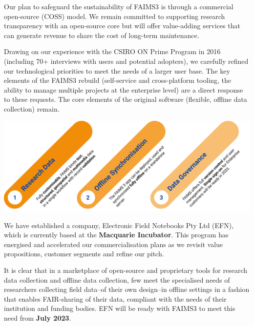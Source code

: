 \documentclass[a0,portrait]{a0poster}
\begin{document}
\begin{multicols}{3}
Our plan to safeguard the sustainability of FAIMS3 is through a commercial open-source (COSS) model. We remain committed to supporting research transparency with an open-source core but will offer value-adding services that can generate revenue to share the cost of long-term maintenance. 

Drawing on our experience with the CSIRO ON Prime Program in 2016 (including 70+ interviews with users and potential adopters), we carefully refined our technological priorities to meet the needs of a larger user base. The key elements of the FAIMS3 rebuild (self-service and cross-platform tooling, the ability to manage multiple projects at the enterprise level) are a direct response to these requests. The core elements of the original software (flexible, offline data collection) remain.


\vspace{1cm}
\begin{center}
\includegraphics[width=\linewidth]{figures/marketing-materials.png}

\end{center}


We have established a company, Electronic Field Notebooks Pty Ltd (EFN), which is currently based at the \textbf{Macquarie Incubator}. This program has energised and accelerated our commercialisation plans as we revisit value propositions, customer segments and refine our pitch. 

It is clear that in a marketplace of open-source and proprietary tools for research data collection and offline data collection, few meet the specialised needs of researchers collecting field data--of their own design--in offline settings in a fashion that enables FAIR-sharing of their data, compliant with the needs of their institution and funding bodies. EFN will be ready with FAIMS3 to meet this need from \textbf{July 2023}.





\end{multicols}
\end{document}

